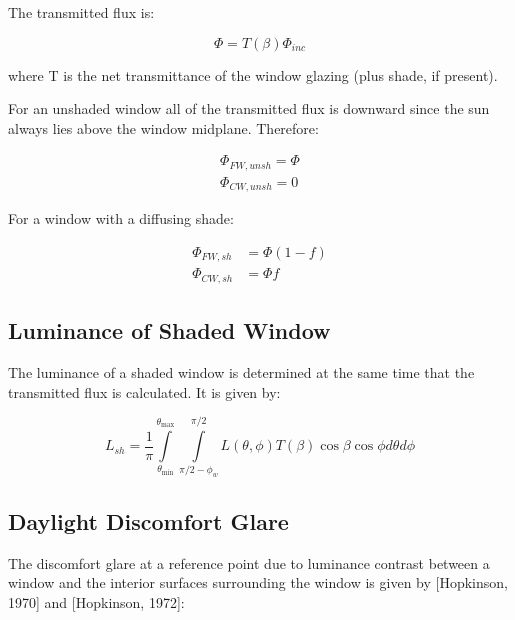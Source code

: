 The transmitted flux is:

\begin{equation}
\Phi  = T(\beta ){\Phi_{inc}}
\end{equation}

where T is the net transmittance of the window glazing (plus shade, if present).

For an unshaded window all of the transmitted flux is downward since the sun always lies above the window midplane. Therefore:

\begin{equation}
\begin{array}{l}
    \Phi_{FW,unsh} = \Phi \\
    \Phi_{CW,unsh} = 0
\end{array}
\end{equation}

For a window with a diffusing shade:

\begin{equation}
  \begin{array}{rl}
    \Phi_{FW,sh} &= \Phi (1 - f) \\
    \Phi_{CW,sh} &= \Phi f
  \end{array}
\end{equation}

\subsection{Luminance of Shaded Window}\label{luminance-of-shaded-window}

The luminance of a shaded window is determined at the same time that the transmitted flux is calculated. It is given by:

\begin{equation}
{L_{sh}} = \frac{1}{\pi }\int\limits_{{\theta_{\min }}}^{{\theta_{\max }}} {\int\limits_{\pi /2 - {\phi_w}}^{\pi /2} {L(\theta ,\phi )T(\beta )\cos \beta \cos \phi d\theta d\phi } }
\end{equation}

\subsection{Daylight Discomfort Glare}\label{daylight-discomfort-glare}

The discomfort glare at a reference point due to luminance contrast between a window and the interior surfaces surrounding the window is given by {[}Hopkinson, 1970{]} and {[}Hopkinson, 1972{]}:

